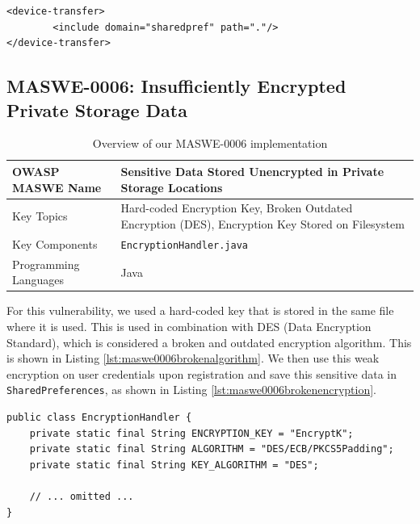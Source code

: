 \begin{lstlisting}[float=tbh, style=XMLStyle, mathescape=true, captionpos=b, caption={Device-to-device transfer rules for \texttt{maswe\_0004}}, label=lst:sensitivedatadevicetransfer]
<device-transfer>
        <include domain="sharedpref" path="."/>
</device-transfer>
\end{lstlisting}

\subsection{MASWE-0006: Insufficiently Encrypted Private Storage Data}

\begin{table}[H]
\centering
\renewcommand{\arraystretch}{1.3}
\begin{tabular}{p{5cm} p{8cm}} 
\toprule
OWASP MASWE Name & Sensitive Data Stored Unencrypted in Private Storage Locations \\ 
\midrule
Key Topics & Hard-coded Encryption Key, Broken Outdated Encryption (DES), Encryption Key Stored on Filesystem \\
Key Components & \texttt{EncryptionHandler.java} \\
Programming Languages & Java \\ 
\bottomrule
\end{tabular}
\caption{Overview of our MASWE-0006 implementation}
\label{tab:maswe-0006}
\end{table}

For this vulnerability, we used a hard-coded key that is stored in the same file where it is used. This is used in combination with DES (Data Encryption Standard), which is considered a broken and outdated encryption algorithm. This is shown in Listing \ref{lst:maswe0006brokenalgorithm}. We then use this weak encryption on user credentials upon registration and save this sensitive data in \texttt{SharedPreferences}, as shown in Listing \ref{lst:maswe0006brokenencryption}.

\begin{lstlisting}[style=JavaStyle, float=tbh, mathescape=true, captionpos=b, caption=Setting up hard-coded encryption key and DES for cryptographic operations, label=lst:maswe0006brokenalgorithm]
public class EncryptionHandler {
    private static final String ENCRYPTION_KEY = "EncryptK";
    private static final String ALGORITHM = "DES/ECB/PKCS5Padding";
    private static final String KEY_ALGORITHM = "DES";

    // ... omitted ...
}
\end{lstlisting}

